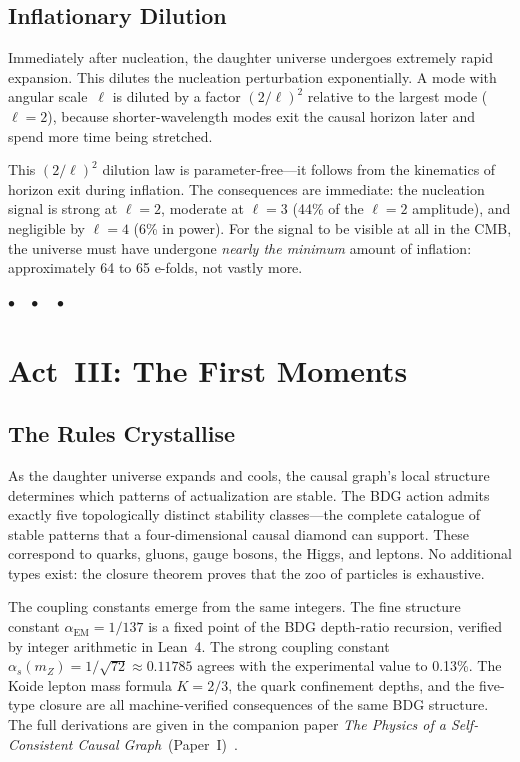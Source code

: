\documentclass[12pt,a4paper]{article}
\begin{document}
\subsection{Inflationary Dilution}

Immediately after nucleation, the daughter universe undergoes extremely rapid expansion. This dilutes the nucleation perturbation exponentially. A mode with angular scale~$\ell$ is diluted by a factor $(2/\ell)^2$ relative to the largest mode ($\ell=2$), because shorter-wavelength modes exit the causal horizon later and spend more time being stretched.

This $(2/\ell)^2$ dilution law is parameter-free---it follows from the kinematics of horizon exit during inflation. The consequences are immediate: the nucleation signal is strong at $\ell=2$, moderate at $\ell=3$ (44\% of the $\ell=2$ amplitude), and negligible by $\ell=4$ (6\% in power). For the signal to be visible at all in the CMB, the universe must have undergone \emph{nearly the minimum} amount of inflation: approximately 64 to 65 e-folds, not vastly more.

\bigskip\begin{center}$\bullet\quad\bullet\quad\bullet$\end{center}\bigskip

\section{Act~III: The First Moments}

\subsection{The Rules Crystallise}

As the daughter universe expands and cools, the causal graph's local structure determines which patterns of actualization are stable. The BDG action admits exactly five topologically distinct stability classes---the complete catalogue of stable patterns that a four-dimensional causal diamond can support. These correspond to quarks, gluons, gauge bosons, the Higgs, and leptons. No additional types exist: the closure theorem proves that the zoo of particles is exhaustive.

The coupling constants emerge from the same integers. The fine structure constant $\alpha_{\mathrm{EM}} = 1/137$ is a fixed point of the BDG depth-ratio recursion, verified by integer arithmetic in Lean~4. The strong coupling constant $\alpha_s(m_Z) = 1/\sqrt{72} \approx 0.11785$ agrees with the experimental value to 0.13\%. The Koide lepton mass formula $K = 2/3$, the quark confinement depths, and the five-type closure are all machine-verified consequences of the same BDG structure. The full derivations are given in the companion paper \emph{The Physics of a Self-Consistent Causal Graph}~(Paper~I)~\cite{P1}.
\end{document}
